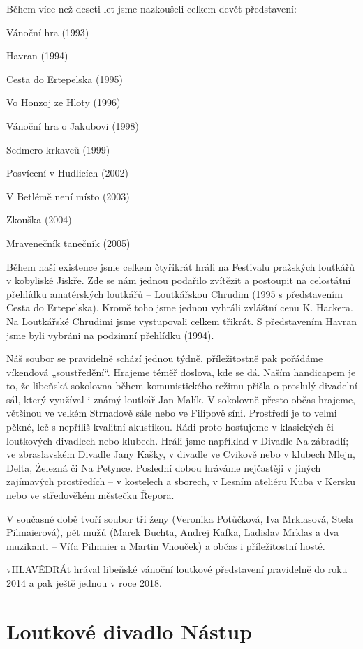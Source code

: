 Během více než deseti let jsme nazkoušeli celkem devět představení:

Vánoční hra (1993)

Havran (1994)

Cesta do Ertepelska (1995)

Vo Honzoj ze Hloty (1996)

Vánoční hra o Jakubovi (1998)

Sedmero krkavců (1999)

Posvícení v Hudlicích (2002)

V Betlémě není místo (2003)

Zkouška (2004)

Mravenečník tanečník (2005)

Během naší existence jsme celkem čtyřikrát hráli na Festivalu pražských
loutkářů v kobyliské Jiskře. Zde se nám jednou podařilo zvítězit a
postoupit na celostátní přehlídku amatérských loutkářů -- Loutkářskou
Chrudim (1995 s představením Cesta do Ertepelska). Kromě toho jsme
jednou vyhráli zvláštní cenu K. Hackera. Na Loutkářské Chrudimi jsme
vystupovali celkem třikrát. S představením Havran jsme byli vybráni na
podzimní přehlídku (1994).

Náš soubor se pravidelně schází jednou týdně, příležitostně pak pořádáme
víkendová „soustředění``. Hrajeme téměř doslova, kde se dá. Naším
handicapem je to, že libeňská sokolovna během komunistického režimu
přišla o proslulý divadelní sál, který využíval i známý loutkář Jan
Malík. V sokolovně přesto občas hrajeme, většinou ve velkém Strnadově
sále nebo ve Filipově síni. Prostředí je to velmi pěkné, leč s nepříliš
kvalitní akustikou. Rádi proto hostujeme v klasických či loutkových
divadlech nebo klubech. Hráli jsme například v Divadle Na zábradlí; ve
zbraslavském Divadle Jany Kašky, v divadle ve Cvikově nebo v klubech
Mlejn, Delta, Železná či Na Petynce. Poslední dobou hráváme nejčastěji v
jiných zajímavých prostředích -- v kostelech a sborech, v Lesním
ateliéru Kuba v Kersku nebo ve středověkém městečku Řepora.

V současné době tvoří soubor tři ženy (Veronika Potůčková, Iva
Mrklasová, Stela Pilmaierová), pět mužů (Marek Buchta, Andrej Kafka,
Ladislav Mrklas a dva muzikanti -- Víťa Pilmaier a Martin Vnouček) a
občas i příležitostní hosté.

vHLAVĚDRÁt hrával libeňské vánoční loutkové představení pravidelně do
roku 2014 a pak ještě jednou v roce 2018.

\section{Loutkové divadlo Nástup}\label{loutkovuxe9-divadlo-nuxe1stup}


